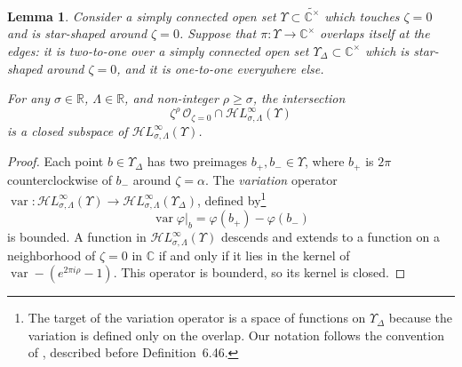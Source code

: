 \documentclass{article}
\newcommand{\singexp}[2]{\mathcal{H}L^\infty_{#1, #2}}
\newcommand{\maps}{\colon}
\newcommand{\R}{\mathbb{R}}
\newcommand{\C}{\mathbb{C}}
\DeclareMathOperator{\var}{var}
\theoremstyle{definition}
\theoremstyle{plain}
\newtheorem{lemma}[definition]{Lemma}
\begin{document}
\begin{lemma}\label{lem:shifted_holo_closed}
Consider a simply connected open set $\Upsilon \subset \widetilde{\C^\times}$ which touches $\zeta = 0$ and is star-shaped around $\zeta = 0$. Suppose that $\pi \maps \Upsilon \to \C^\times$ overlaps itself at the edges: it is two-to-one over a simply connected open set $\Upsilon_\Delta \subset \C^\times$ which is star-shaped around $\zeta = 0$, and it is one-to-one everywhere else.
\begin{center}
\label{fig:domain_Upsilon}
\end{center}
For any $\sigma \in \R$, $\Lambda \in \R$, and non-integer $\rho \ge \sigma$, the intersection
\[ \zeta^\rho\,\mathcal{O}_{\zeta = 0} \cap \singexp{\sigma}{\Lambda}(\Upsilon) \]
is a closed subspace of $\singexp{\sigma}{\Lambda}(\Upsilon)$.
\end{lemma}
\begin{proof}
Each point $b \in \Upsilon_\Delta$ has two preimages $b_+, b_- \in \Upsilon$, where $b_+$ is $2\pi$ counterclockwise of $b_-$ around $\zeta = \alpha$. The {\em variation} operator $\var \maps \singexp{\sigma}{\Lambda}(\Upsilon) \to \singexp{\sigma}{\Lambda}(\Upsilon_\Delta)$, defined by\footnote{The target of the variation operator is a space of functions on $\Upsilon_\Delta$ because the variation is defined only on the overlap. Our notation follows the convention of \cite{diverg-resurg-i}, described before Definition~6.46.}
\[ \var \varphi \big|_b = \varphi(b_+) - \varphi(b_-) \]
is bounded. A function in $\singexp{\sigma}{\Lambda}(\Upsilon)$ descends and extends to a function on a neighborhood of $\zeta = 0$ in $\C$ if and only if it lies in the kernel of $\var - (e^{2\pi i \rho} - 1)$. This operator is bounderd, so its kernel is closed.
\end{proof}
\end{document}
